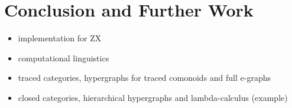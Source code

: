 
\section{Conclusion and Further Work}

\begin{itemize}
\item implementation for ZX
\item computational linguistics
\item traced categories, hypergraphs for traced comonoids and full e-graphs
\item closed categories, hierarchical hypergraphs and lambda-calculus (example)
\end{itemize}